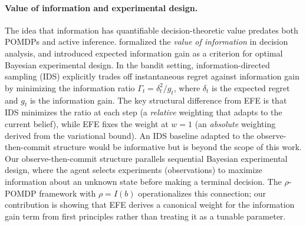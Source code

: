 \documentclass{article}
\begin{document}
\paragraph{Value of information and experimental design.}
The idea that information has quantifiable decision-theoretic value predates both POMDPs and active inference. \citet{howard1966} formalized the \emph{value of information} in decision analysis, and \citet{lindley1956} introduced expected information gain as a criterion for optimal Bayesian experimental design. In the bandit setting, information-directed sampling (IDS) \citep{russo2014} explicitly trades off instantaneous regret against information gain by minimizing the information ratio $\Gamma_t = \delta_t^2 / g_t$, where $\delta_t$ is the expected regret and $g_t$ is the information gain. The key structural difference from EFE is that IDS minimizes the ratio at each step (a \emph{relative} weighting that adapts to the current belief), while EFE fixes the weight at $w{=}1$ (an \emph{absolute} weighting derived from the variational bound). An IDS baseline adapted to the observe-then-commit structure would be informative but is beyond the scope of this work. Our observe-then-commit structure parallels sequential Bayesian experimental design, where the agent selects experiments (observations) to maximize information about an unknown state before making a terminal decision. The $\rho$-POMDP framework with $\rho = I(b)$ operationalizes this connection; our contribution is showing that EFE derives a canonical weight for the information gain term from first principles rather than treating it as a tunable parameter.
\end{document}
